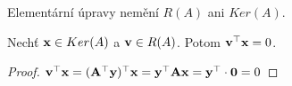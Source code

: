 \begin{observation}
    Elementární úpravy nemění $R(A)$ ani $Ker(A)$.
\end{observation}

\begin{observation}
    Nechť $\mathbf{x} \in Ker(A)$ a $\mathbf{v} \in R(A)$. Potom $\mathbf{v}^{\top}\mathbf{x} = 0$.
\end{observation}

\begin{proof}
    $\mathbf{v}^{\top}\mathbf{x} = (\mathbf{A}^{\top}\mathbf{y})^{\top}\mathbf{x} = \mathbf{y}^{\top}\mathbf{A}\mathbf{x} = 
    \mathbf{y}^{\top} \cdot \mathbf{0} = 0$
\end{proof}
